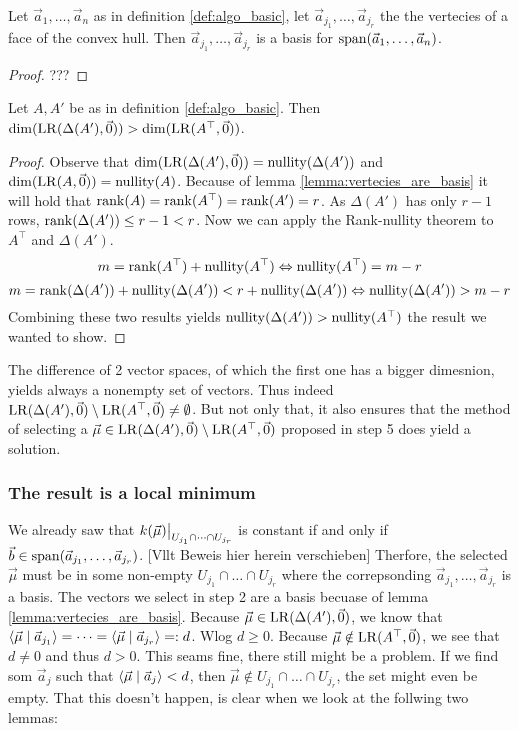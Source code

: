\begin{lemma}
    \label{lemma:vertecies_are_basis}
    Let $\vec a_1, \dots, \vec a_n$ as in definition \ref{def:algo_basic}, let $\vec a_{j_1}, \dots, \vec a_{j_r}$ the the vertecies of a face of the convex hull. Then $\vec a_{j_1}, \dots, \vec a_{j_r}$ is a basis for $\operatorname{span}(\vec a_1, \dots, \vec a_n)$.
\end{lemma}
\begin{proof}
    ???
\end{proof}
\begin{lemma}
    Let $A, A'$ be as in definition \ref{def:algo_basic}. Then $\dim(\operatorname{LR}(\Delta(A'), \vec0)) > \dim(\operatorname{LR}(A^\top, \vec0))$.
\end{lemma}
\begin{proof}
    Observe that $\dim(\operatorname{LR}(\Delta(A'), \vec0)) = \operatorname{nullity}(\Delta(A'))$ and $\dim(\operatorname{LR}(A, \vec0)) = \operatorname{nullity}(A)$. Because of lemma \ref{lemma:vertecies_are_basis} it will hold that $\operatorname{rank}(A) = \operatorname{rank}(A^\top) = \operatorname{rank}(A') = r$. As $\Delta(A')$ has only $r-1$ rows, $\operatorname{rank}(\Delta(A')) \leq r-1 < r$. Now we can apply the Rank-nullity theorem to $A^\top$ and $\Delta(A')$.
    $$m = \operatorname{rank}(A^\top) + \operatorname{nullity}(A^\top) \Leftrightarrow \operatorname{nullity}(A^\top) = m - r$$
    $$m = \operatorname{rank}(\Delta(A')) + \operatorname{nullity}(\Delta(A')) < r + \operatorname{nullity}(\Delta(A'))\Leftrightarrow \operatorname{nullity}(\Delta(A')) > m - r$$
    Combining these two results yields $\operatorname{nullity}(\Delta(A')) > \operatorname{nullity}(A^\top)$ the result we wanted to show.
\end{proof}
The difference of 2 vector spaces, of which the first one has a bigger dimesnion, yields always a nonempty set of vectors. Thus indeed $\operatorname{LR}(\Delta(A'), \vec0) \setminus \operatorname{LR}(A^\top, \vec0) \neq \emptyset$. But not only that, it also ensures that the method of selecting a $\vec\mu \in \operatorname{LR}(\Delta(A'), \vec0) \setminus \operatorname{LR}(A^\top, \vec0)$ proposed in step 5 does yield a solution.

\subsubsection{The result is a local minimum}
We already saw that $\restrict{k(\vec\mu)}{U_{j_1} \cap \dots \cap U_{j_r}}$ is constant if and only if $\vec b \in \operatorname{span}(\vec a_{j_1}, \dots, \vec a_{j_r})$. [Vllt Beweis hier herein verschieben] Therfore, the selected $\vec\mu$ must be in some non-empty $U_{j_1} \cap \dots \cap U_{j_r}$ where the correpsonding $\vec a_{j_1}, \dots, \vec a_{j_r}$ is a basis. The vectors we select in step 2 are a basis becuase of lemma \ref{lemma:vertecies_are_basis}. Because $\vec\mu \in \operatorname{LR}(\Delta(A'), \vec0)$, we know that $\langle \vec\mu \mid \vec a_{j_1} \rangle = \dots = \langle \vec\mu \mid \vec a_{j_r} \rangle =: d$. Wlog $d \geq 0$. Because $\vec\mu \notin \operatorname{LR}(A^\top, \vec0)$, we see that $d \neq 0$ and thus $d > 0$. This seams fine, there still might be a problem. If we find som $\vec a_j$ such that $\langle \vec\mu \mid \vec a_j \rangle < d$, then $\vec\mu \notin U_{j_1} \cap \dots \cap U_{j_r}$, the set might even be empty. That this doesn't happen, is clear when we look at the follwing two lemmas:


